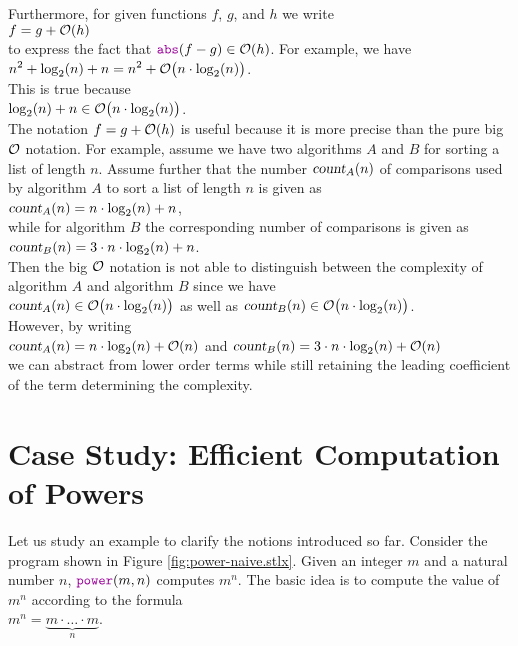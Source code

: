 Furthermore, for given functions $f$, $g$, and $h$ we write
\\[0.2cm]
\hspace*{1.3cm}
$f = g + \mathcal{O}(h)$
\\[0.2cm]
to express the fact that  $\mytt{abs}(f - g) \in \Oh(h)$.  For example, we have 
\\[0.2cm]
\hspace*{1.3cm}
$\displaystyle n^2 + \log_2(n) + n = n^2 + \mathcal{O}\bigl(n \cdot \log_2(n)\bigr)$.
\\[0.2cm]
This is true because
\\[0.2cm]
\hspace*{1.3cm}
$\displaystyle \log_2(n) + n \in \mathcal{O}\bigl(n \cdot \log_2(n)\bigr)$.
\\[0.2cm] 
The notation $f = g + \mathcal{O}(h)$ is useful because it is more precise than the pure big $\mathcal{O}$
notation.  For example, assume we have two algorithms $A$ and $B$ for sorting a list of length
$n$.  Assume further that the number $\textsl{count}_A(n)$ of comparisons used by algorithm $A$ to sort a list of
length $n$ is given as
\\[0.2cm]
\hspace*{1.3cm}
$\displaystyle\textsl{count}_A(n) = n \cdot \log_2(n) + n$,
\\[0.2cm]
while for algorithm $B$ the corresponding number of comparisons is given as
\\[0.2cm]
\hspace*{1.3cm}
$\displaystyle\textsl{count}_B(n) = 3 \cdot n \cdot \log_2(n) + n$.
\\[0.2cm]
Then the big $\mathcal{O}$ notation is not able to distinguish between the complexity of algorithm $A$ and
algorithm $B$ since we have
\\[0.2cm]
\hspace*{1.3cm}
$\textsl{count}_A(n) \in \mathcal{O}\bigl(n \cdot \log_2(n)\bigr)$ \quad as well as \quad
$\textsl{count}_B(n) \in \mathcal{O}\bigl(n \cdot \log_2(n)\bigr)$.
\\[0.2cm]
However, by writing
\\[0.2cm]
\hspace*{1.3cm}
$\displaystyle\textsl{count}_A(n) = n \cdot \log_2(n) + \mathcal{O}(n)$ \quad and \quad
$\displaystyle\textsl{count}_B(n) = 3 \cdot n \cdot \log_2(n) + \mathcal{O}(n)$
\\[0.2cm]
we can abstract from lower order terms while still retaining the leading coefficient of the term
determining the complexity.  

\section[Computation of Powers]{Case Study:  Efficient Computation of Powers}
Let us study an example to clarify the notions introduced so far.  
Consider the program shown in Figure \ref{fig:power-naive.stlx}.  Given an integer $m$ and a
natural number $n$, $\mytt{power}(m, n)$ computes $m^n$.
The basic idea is to compute the value of $m^n$ according to the formula \\[0.2cm]
\hspace*{1.3cm} 
$m^n = \underbrace{m \cdot {\dots} \cdot m}_n$. 



